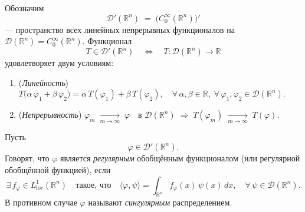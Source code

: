 \begin{definition}
Обозначим
\[
\mathcal{D}'(\mathbb{R}^n)
\;=\;
\bigl(C_0^\infty(\mathbb{R}^n)\bigr)'
\]
— пространство всех линейных непрерывных функционалов на $\mathcal{D}(\mathbb{R}^n)=C_0^\infty(\mathbb{R}^n)$.  
Функционал  
\[
T\in \mathcal{D}'(\mathbb{R}^n)
\quad\Longleftrightarrow\quad
T:\mathcal{D}(\mathbb{R}^n)\to\mathbb{R}
\]
удовлетворяет двум условиям:
\begin{enumerate}
  \item (\emph{Линейность})  
    $\displaystyle
      T\bigl(\alpha\,\varphi_1 + \beta\,\varphi_2\bigr)
      =\alpha\,T(\varphi_1)+\beta\,T(\varphi_2),
      \quad
      \forall\,\alpha,\beta\in\mathbb{R},\;\forall\,\varphi_1,\varphi_2\in\mathcal{D}(\mathbb{R}^n).
    $
  \item (\emph{Непрерывность})  
    $\displaystyle
      \varphi_m\;\xrightarrow[m\to\infty]{}\;\varphi
      \quad\text{в }\mathcal{D}(\mathbb{R}^n)
      \;\Longrightarrow\;
      T(\varphi_m)\;\xrightarrow[m\to\infty]{}\;T(\varphi).
    $
\end{enumerate}
\end{definition}

\begin{definition}
Пусть
\[
\varphi\in\mathcal{D}'(\mathbb{R}^n).
\]
Говорят, что \(\varphi\) является \emph{регулярным} обобщённым функционалом (или регулярной обобщённой функцией), если
\[
\exists\,f_\varphi\in L^1_{\mathrm{loc}}(\mathbb{R}^n)\quad\text{такое, что}\quad
\langle \varphi,\psi\rangle
=\int_{\mathbb{R}^n}f_\varphi(x)\,\psi(x)\,dx,
\quad
\forall\,\psi\in\mathcal{D}(\mathbb{R}^n).
\]
В противном случае \(\varphi\) называют \emph{сингулярным} распределением.
\end{definition}

